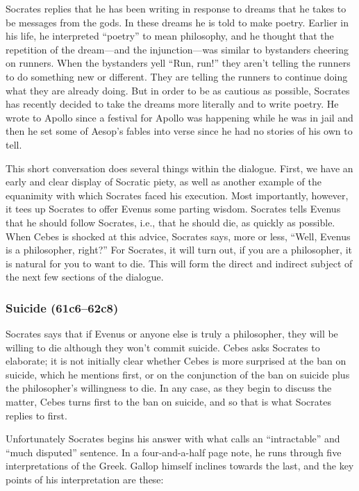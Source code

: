 \documentclass[12pt,letterpaper]{article}
\begin{document}
Socrates replies that he has been writing in response to dreams that he takes to be messages from the gods. In these dreams he is told to make poetry. Earlier in his life, he interpreted ``poetry'' to mean philosophy, and he thought that the repetition of the dream---and the injunction---was similar to bystanders cheering on runners. When the bystanders yell ``Run, run!'' they aren't telling the runners to do something new or different. They are telling the runners to continue doing what they are already doing. But in order to be as cautious as possible, Socrates has recently decided to take the dreams more literally and to write poetry. He wrote to Apollo since a festival for Apollo was happening while he was in jail and then he set some of Aesop's fables into verse since he had no stories of his own to tell.

This short conversation does several things within the dialogue. First, we have an early and clear display of Socratic piety, as well as another example of the equanimity with which Socrates faced his execution. Most importantly, however, it tees up Socrates to offer Evenus some parting wisdom. Socrates tells Evenus that he should follow Socrates, i.e., that he should die, as quickly as possible. When Cebes is shocked at this advice, Socrates says, more or less, ``Well, Evenus is a philosopher, right?'' For Socrates, it will turn out, if you are a philosopher, it is natural for you to want to die. This will form the direct and indirect subject of the next few sections of the dialogue.

\subsubsection{Suicide (61c6--62c8)}

Socrates says that if Evenus or anyone else is truly a philosopher, they will be willing to die although they won't commit suicide. Cebes asks Socrates to elaborate; it is not initially clear whether Cebes is more surprised at the ban on suicide, which he mentions first, or on the conjunction of the ban on suicide plus the philosopher's willingness to die. In any case, as they begin to discuss the matter, Cebes turns first to the ban on suicide, and so that is what Socrates replies to first.

Unfortunately Socrates begins his answer with what \textcite[\textit{ad} 62a2--7]{gallop1975} calls an ``intractable'' and ``much disputed'' sentence. In a four-and-a-half page note, he runs through five interpretations of the Greek. Gallop himself inclines towards the last, and the key points of his interpretation are these:
\end{document}
